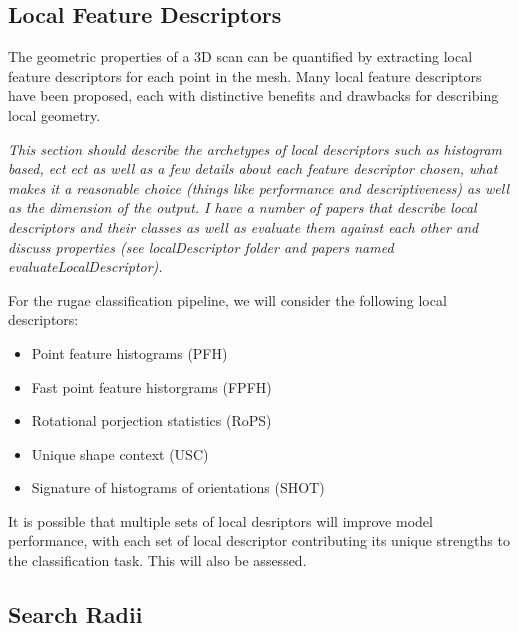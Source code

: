 \documentclass[11pt]{article}
\theoremstyle{definition}
\begin{document}
\subsection{Local Feature Descriptors}

The geometric properties of a 3D scan can be quantified by extracting local feature descriptors for each point in the mesh. Many local feature descriptors have been proposed, each with distinctive benefits and drawbacks for describing local geometry. 

\textit{This section should describe the archetypes of local descriptors such as histogram based, ect ect as well as a few details about each feature descriptor chosen, what makes it a reasonable choice (things like performance and descriptiveness) as well as the dimension of the output. I have a number of papers that describe local descriptors and their classes as well as evaluate them against each other and discuss properties (see localDescriptor folder and papers named evaluateLocalDescriptor).}

For the rugae classification pipeline, we will consider the following local descriptors:
\begin{itemize}
    \item Point feature histograms (PFH)
    \item Fast point feature historgrams (FPFH)
    \item Rotational porjection statistics (RoPS)
    \item Unique shape context (USC)
    \item Signature of histograms of orientations (SHOT)
\end{itemize}

It is possible that multiple sets of local desriptors will improve model performance, with each set of local descriptor contributing its unique strengths to the classification task. This will also be assessed.

\subsection{Search Radii}
\end{document}
